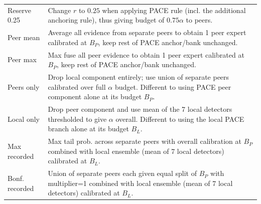 {\begin{longtable}{p{}p{}}
Reserve 0.25 & Change $r$ to $0.25$ when applying PACE rule (incl. the additional anchoring rule), thus giving budget of $0.75\alpha$ to peers.\\
Peer mean & Average all evidence from separate peers to obtain 1 peer expert calibrated at $B_P$, keep rest of PACE anchor/bank unchanged.\\
Peer max & Max fuse all peer evidence to obtain 1 peer expert calibrated at $B_P$, keep rest of PACE anchor/bank unchanged.\\
Peers only & Drop local component entirely; use union of separate peers calibrated over full $\alpha$ budget. Different to using PACE peer component alone at its budget $B_P$.\\
Local only & Drop peer component and use mean of the 7 local detectors thresholded to give $\alpha$ overall. Different to using the local PACE branch alone at its budget $B_L$.\\
Max recorded & Max tail prob. across separate peers with overall calibration at $B_P$ combined with local ensemble (mean of 7 local detectors) calibrated at $B_L$.\\
Bonf. recorded & Union of separate peers each given equal split of $B_P$ with multiplier=1 combined with local ensemble (mean of 7 local detectors) calibrated at $B_L$.\\
\end{longtable}} 
